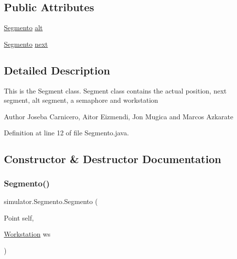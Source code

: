 \subsection*{Public Attributes}
\begin{DoxyCompactItemize}
\item 
\mbox{\hyperlink{classsimulator_1_1_segmento}{Segmento}} \mbox{\hyperlink{classsimulator_1_1_segmento_a0ac22ab701cfb44a6ca41cc831df2695}{alt}}
\item 
\mbox{\hyperlink{classsimulator_1_1_segmento}{Segmento}} \mbox{\hyperlink{classsimulator_1_1_segmento_a1cceb01f5ffd65b3a53422fa9e05913c}{next}}
\end{DoxyCompactItemize}


\subsection{Detailed Description}
This is the Segment class. Segment class contains the actual position, next segment, alt segment, a semaphore and workstation

\begin{DoxyAuthor}{Author}
Joseba Carnicero, Aitor Eizmendi, Jon Mugica and Marcos Azkarate 
\end{DoxyAuthor}


Definition at line 12 of file Segmento.\+java.



\subsection{Constructor \& Destructor Documentation}
\mbox{\label{classsimulator_1_1_segmento_a441279b72c14ab4e5dab49098eec3dac}} 
\subsubsection{\texorpdfstring{Segmento()}{Segmento()}}
{\footnotesize\ttfamily simulator.\+Segmento.\+Segmento (\begin{DoxyParamCaption}\item[{Point}]{self,  }\item[{\mbox{\hyperlink{classsimulator_1_1_workstation}{Workstation}}}]{ws }\end{DoxyParamCaption})}



